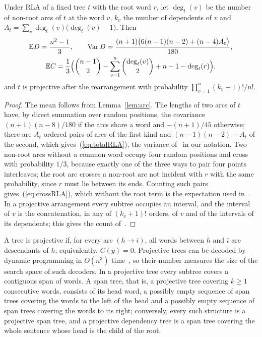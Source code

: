 \documentclass[mathematics,article,submit,pdftex,oneauthor]{Definitions/mdpi}
\newcommand{\E}{\mathbb E}
\newcommand{\Var}{\operatorname{Var}}
\begin{document}
\begin{Lemma}\label{lem:rla}
Under RLA of a fixed tree $t$ with the root word $r$, let $\deg_t(v)$ be the number of non-root arcs of $t$ at the word $v$, $k_v$ the number of dependents of $v$ and $A_t=\sum_v\deg_t(v)\bigl(\deg_t(v)-1\bigr)$. Then
\begin{gather}
\E D=\frac{n^2-1}{3},\qquad \Var D=\frac{(n+1)\bigl(6(n-1)(n-2)+(n-4)A_t\bigr)}{180},\label{eq:totalRLA}\\
\E C=\frac13\Bigl(\binom{n-1}{2}-\sum_{v=1}^{n}\binom{\deg_t(v)}{2}+n-1-\deg_t(r)\Bigr),\label{eq:crossRLA}
\end{gather}
and $t$ is projective after the rearrangement with probability $\prod_{v=1}^{n}(k_v+1)!/n!$.
\end{Lemma}
\begin{proof}
The mean follows from Lemma~\ref{lem:arc}. The lengths of two arcs of $t$ have, by direct summation over random positions, the covariance $(n+1)(n-8)/180$ if the arcs share a word and $-(n+1)/45$ otherwise; there are $A_t$ ordered pairs of arcs of the first kind and $(n-1)(n-2)-A_t$ of the second, which gives~(\ref{eq:totalRLA}), the variance of~\cite{FerreriCancho2019} in our notation.
Two non-root arcs without a common word occupy four random positions and cross with probability $1/3$, because exactly one of the three ways to pair four points interleaves; the root arc crosses a non-root arc not incident with $r$ with the same probability, since $r$ must lie between its ends.
Counting such pairs gives~(\ref{eq:crossRLA}), which without the root term is the expectation used in~\cite{FerreriCancho2018}.
In a projective arrangement every subtree occupies an interval, and the interval of $v$ is the concatenation, in any of $(k_v+1)!$ orders, of $v$ and of the intervals of its dependents; this gives the count of~\cite{AlemanyPuig2022}.
\end{proof}

A tree is projective if, for every arc $(h\to i)$, all words between $h$ and $i$ are descendants of $h$; equivalently, $C(y)=0$.
Projective trees can be decoded by dynamic programming in $O(n^3)$ time~\cite{Eisner1996}, so their number measures the size of the search space of such decoders.
In a projective tree every subtree covers a contiguous span of words.
A span tree, that is, a projective tree covering $k\geqslant1$ consecutive words, consists of its head word, a possibly empty sequence of span trees covering the words to the left of the head and a possibly empty sequence of span trees covering the words to its right; conversely, every such structure is a projective span tree, and a projective dependency tree is a span tree covering the whole sentence whose head is the child of the root.
\end{document}
